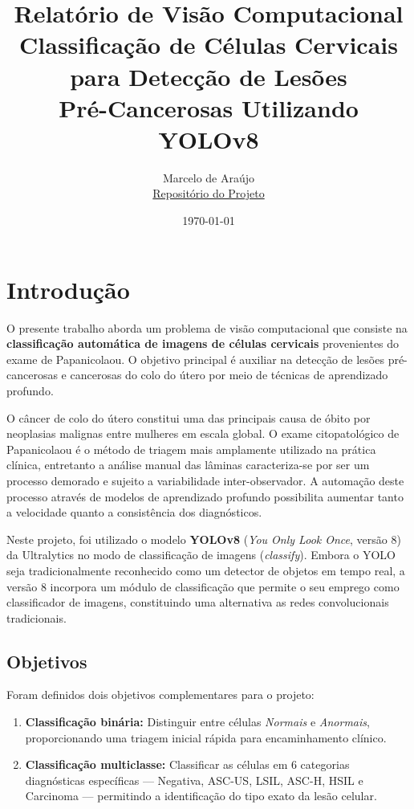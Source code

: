 \documentclass[12pt, a4paper]{article}
\title{%
    \textbf{Relatório de Visão Computacional} \\[0.5cm]
    \large Classificação de Células Cervicais para Detecção de Lesões \\
    Pré-Cancerosas Utilizando YOLOv8
}
\author{Marcelo de Araújo \\ \href{https://github.com/AIWASS23/cte-vc}{Repositório do Projeto}}
\date{\today}
\begin{document}
\maketitle
\tableofcontents
\newpage

\section{Introdução}

O presente trabalho aborda um problema de visão computacional que consiste na \textbf{classificação automática de imagens de células cervicais} provenientes do exame de Papanicolaou. O objetivo principal é auxiliar na detecção de lesões pré-cancerosas e cancerosas do colo do útero por meio de técnicas de aprendizado profundo.

O câncer de colo do útero constitui uma das principais causa de óbito por neoplasias malignas entre mulheres em escala global. O exame citopatológico de Papanicolaou é o método de triagem mais amplamente utilizado na prática clínica, entretanto a análise manual das lâminas caracteriza-se por ser um processo demorado e sujeito a variabilidade inter-observador. A automação deste processo através de modelos de aprendizado profundo possibilita aumentar tanto a velocidade quanto a consistência dos diagnósticos.

Neste projeto, foi utilizado o modelo \textbf{YOLOv8} (\textit{You Only Look Once}, versão 8) da Ultralytics no modo de classificação de imagens (\textit{classify}). Embora o YOLO seja tradicionalmente reconhecido como um detector de objetos em tempo real, a versão 8 incorpora um módulo de classificação que permite o seu emprego como classificador de imagens, constituindo uma alternativa as redes convolucionais tradicionais.

\subsection{Objetivos}

Foram definidos dois objetivos complementares para o projeto:

\begin{enumerate}
    \item \textbf{Classificação binária:} Distinguir entre células \textit{Normais} e \textit{Anormais}, proporcionando uma triagem inicial rápida para encaminhamento clínico.
    \item \textbf{Classificação multiclasse:} Classificar as células em 6 categorias diagnósticas específicas --- Negativa, ASC-US, LSIL, ASC-H, HSIL e Carcinoma --- permitindo a identificação do tipo exato da lesão celular.
\end{enumerate}
\end{document}
